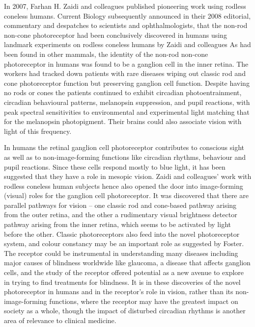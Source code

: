 \documentclass[]{book}
\begin{document}
In 2007, Farhan H. Zaidi and colleagues published pioneering work using rodless coneless humans. Current Biology subsequently announced in their 2008 editorial, commentary and despatches to scientists and ophthalmologists, that the non-rod non-cone photoreceptor had been conclusively discovered in humans using landmark experiments on rodless coneless humans by Zaidi and colleagues As had been found in other mammals, the identity of the non-rod non-cone photoreceptor in humans was found to be a ganglion cell in the inner retina. The workers had tracked down patients with rare diseases wiping out classic rod and cone photoreceptor function but preserving ganglion cell function. Despite having no rods or cones the patients continued to exhibit circadian photoentrainment, circadian behavioural patterns, melanopsin suppression, and pupil reactions, with peak spectral sensitivities to environmental and experimental light matching that for the melanopsin photopigment. Their brains could also associate vision with light of this frequency.

In humans the retinal ganglion cell photoreceptor contributes to conscious sight as well as to non-image-forming functions like circadian rhythms, behaviour and pupil reactions. Since these cells respond mostly to blue light, it has been suggested that they have a role in mesopic vision. Zaidi and colleagues' work with rodless coneless human subjects hence also opened the door into image-forming (visual) roles for the ganglion cell photoreceptor. It was discovered that there are parallel pathways for vision -- one classic rod and cone-based pathway arising from the outer retina, and the other a rudimentary visual brightness detector pathway arising from the inner retina, which seems to be activated by light before the other. Classic photoreceptors also feed into the novel photoreceptor system, and colour constancy may be an important role as suggested by Foster. The receptor could be instrumental in understanding many diseases including major causes of blindness worldwide like glaucoma, a disease that affects ganglion cells, and the study of the receptor offered potential as a new avenue to explore in trying to find treatments for blindness. It is in these discoveries of the novel photoreceptor in humans and in the receptor's role in vision, rather than its non-image-forming functions, where the receptor may have the greatest impact on society as a whole, though the impact of disturbed circadian rhythms is another area of relevance to clinical medicine.
\end{document}
